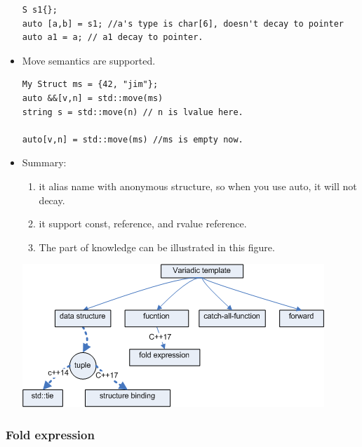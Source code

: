 \documentclass[a4paper,11pt,twoside]{book}
\begin{document}
\begin{itemize}
\begin{lstlisting}
S s1{};
auto [a,b] = s1; //a's type is char[6], doesn't decay to pointer
auto a1 = a; // a1 decay to pointer. 
\end{lstlisting}	

    \item Move semantics are supported.

\begin{lstlisting}
My Struct ms = {42, "jim"};
auto &&[v,n] = std::move(ms)
string s = std::move(n) // n is lvalue here.

auto[v,n] = std::move(ms) //ms is empty now.
\end{lstlisting}	


\item Summary:
\begin{enumerate}
	\item it alias name with anonymous structure, so when you use auto, it will not decay.
	\item it support const, reference, and rvalue reference.
    \item The part of knowledge can be illustrated in this figure.
\end{enumerate}
\begin{center}
    \includegraphics[width=0.85\linewidth]{pics/Variadic.png}
\end{center}
\end{itemize}

\subsubsection{Fold expression}
\end{document}
